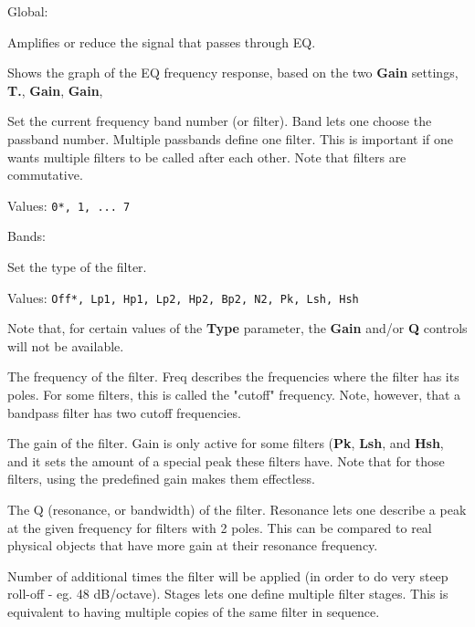    Global:

   \setcounter{ItemCounter}{0}      %

   Amplifies or reduce the signal that passes through EQ.

   Shows the graph of the EQ frequency response, based on the
   two \textbf{Gain} settings,
   \textbf{T.},
   \textbf{Gain},
   \textbf{Gain},

   Set the current frequency band number (or filter).
   Band lets one choose the passband number. Multiple passbands define one
   filter. This is important if one wants multiple filters to be called
   after each other. Note that filters are commutative.

   Values: \texttt{0*, 1, ... 7}

   Bands:

   Set the type of the filter.

   Values: \texttt{Off*, Lp1, Hp1, Lp2, Hp2, Bp2, N2, Pk, Lsh, Hsh}

   Note that, for certain values of the \textbf{Type} parameter, the
   \textbf{Gain} and/or \textbf{Q} controls will not be available.

   The frequency of the filter.
   Freq describes the frequencies where the filter has its poles. For some
   filters, this is called the "cutoff" frequency. Note, however, that a
   bandpass filter has two cutoff frequencies.

   The gain of the filter.
   Gain is only active for some filters
   (\textbf{Pk}, \textbf{Lsh}, and \textbf{Hsh},
   and it sets the amount of a special
   peak these filters have. Note that for those filters, using the
   predefined gain makes them effectless.

   The Q (resonance, or bandwidth) of the filter.
   Resonance lets one describe a peak at the given frequency for filters
   with 2 poles. This can be compared to real physical objects that have
   more gain at their resonance frequency.

   Number of additional times the filter will be applied (in
   order to do very steep roll-off - eg. 48 dB/octave).
   Stages lets one define multiple filter stages. This is equivalent to
   having multiple copies of the same filter in sequence.

